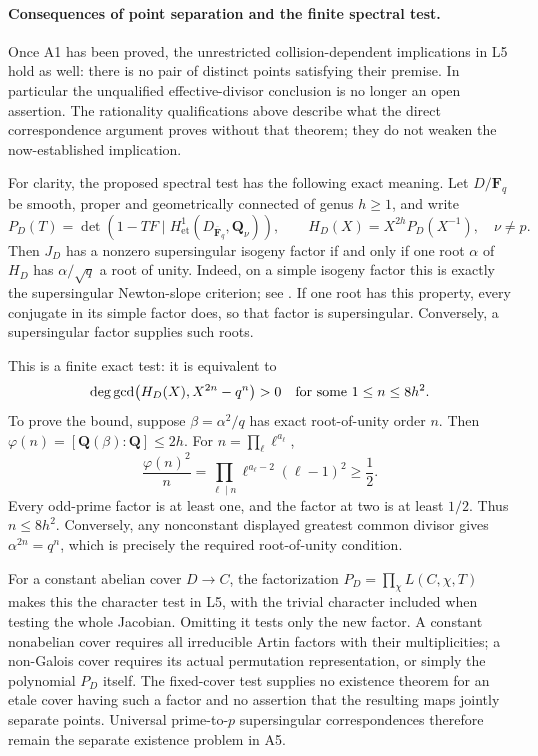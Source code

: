 \paragraph{Consequences of point separation and the finite spectral test.}
Once A1 has been proved, the unrestricted collision-dependent
implications in L5 hold as well: there is no pair of distinct
points satisfying their premise. In particular the unqualified
effective-divisor conclusion is no longer an open assertion.
The rationality qualifications above describe what the direct
correspondence argument proves without that theorem; they do
not weaken the now-established implication.

For clarity, the proposed spectral test has the following exact
meaning. Let $D/\mathbf F_q$ be smooth, proper and geometrically
connected of genus $h\ge1$, and write
\[
 P_D(T)=\det(1-TF\mid H^1_{\mathrm{et}}
       (D_{\overline{\mathbf F}_q},\mathbf Q_\nu)),
 \qquad
 H_D(X)=X^{2h}P_D(X^{-1}),\quad \nu\ne p.
\]
Then $J_D$ has a nonzero supersingular isogeny factor if and
only if one root $\alpha$ of $H_D$ has
$\alpha/\sqrt q$ a root of unity. Indeed, on a simple
isogeny factor this is exactly the supersingular
Newton-slope criterion; see
\cite[\S\S21.20--21.21(3)]{AC_Oort2008}. If one root has
this property, every conjugate in its simple factor does,
so that factor is supersingular. Conversely, a
supersingular factor supplies such roots.

This is a finite exact test: it is equivalent to
\[
 \deg\gcd\bigl(H_D(X),X^{2n}-q^n\bigr)>0
 \quad\hbox{for some }1\le n\le8h^2.
\]
To prove the bound, suppose $\beta=\alpha^2/q$ has exact
root-of-unity order $n$. Then
$\varphi(n)=[\mathbf Q(\beta):\mathbf Q]\le2h$.
For $n=\prod_\ell\ell^{a_\ell}$,
\[
 \frac{\varphi(n)^2}{n}
       =\prod_{\ell\mid n}\ell^{a_\ell-2}(\ell-1)^2
       \ge\frac12.
\]
Every odd-prime factor is at least one, and the factor
at two is at least $1/2$. Thus $n\le8h^2$.
Conversely, any nonconstant displayed greatest common
divisor gives $\alpha^{2n}=q^n$, which is precisely the
required root-of-unity condition.

For a constant abelian cover $D\to C$, the factorization
$P_D=\prod_\chi L(C,\chi,T)$ makes this the character
test in L5, with the trivial character included when
testing the whole Jacobian. Omitting it tests only the
new factor. A constant nonabelian cover requires all
irreducible Artin factors with their multiplicities;
a non-Galois cover requires its actual permutation
representation, or simply the polynomial $P_D$ itself.
The fixed-cover test supplies no existence theorem for
an etale cover having such a factor and no assertion
that the resulting maps jointly separate points.
Universal prime-to-$p$ supersingular correspondences
therefore remain the separate existence problem in A5.
